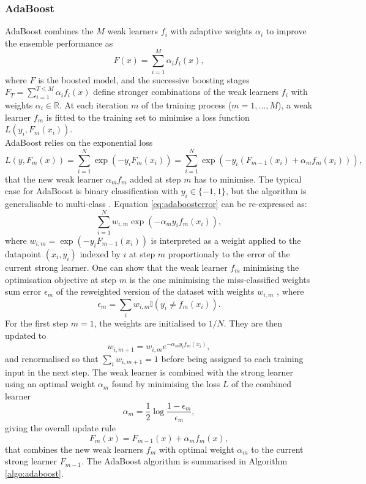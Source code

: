 \subsubsection{AdaBoost}\label{sub-adaboosted}
AdaBoost combines the $M$ weak learners $f_i$ with adaptive weights $\alpha_i$ to improve the ensemble performance as \[F(x) = \sum_{i=1}^M \alpha_i f_i(x),\] where $F$ is the boosted model, and the successive boosting stages $F_T = \sum_{i=1}^{T \leq M} \alpha_i f_i(x)$ define stronger combinations of the weak learners $f_i$ with weights $\alpha_i \in \mathbb{R}$. At each iteration $m$ of the training process ($m = 1, ..., M$), a weak learner $f_m$ is fitted to the training set to minimise a loss function $L(y_i, F_{m}(x_i))$. \\

AdaBoost relies on the exponential loss
\begin{equation}\label{eq:adaboosterror}
    L(y, F_m(x)) = \sum_{i=1}^N \exp\left(-y_i F_m(x_i)\right) = \sum_{i=1}^N \exp\left(-y_i (F_{m-1}(x_i) + \alpha_m f_m(x_i))\right),
\end{equation}
that the new weak learner $\alpha_m f_m$ added at step $m$ has to minimise. The typical case for AdaBoost is binary classification with $y_i \in \{-1, 1\}$, but the algorithm is generalisable to multi-class \cite{MurphyML}. Equation \ref{eq:adaboosterror} can be re-expressed as: \[\sum_{i=1}^N w_{i,m} \exp\left(-\alpha_m y_i f_m(x_i)\right),\] where $w_{i,m} = \exp\left(-y_i F_{m-1}(x_i)\right)$ is interpreted as a weight applied to the datapoint $(x_i, y_i)$  indexed by $i$ at step $m$ proportionaly to the error of the current strong learner. One can show that the weak learner $f_m$ minimising the optimisation objective at step $m$ is the one minimising the miss-classified weights sum error $\epsilon_m$ of the reweighted version of the dataset with weights $w_{i,m}$ \cite{MurphyML}, where \[\epsilon_m = \sum_i w_{i,m} \mathbb{I}(y_i \neq f_m(x_i)).\] For the first step $m = 1$, the weights are initialised to $1 / N$. They are then updated to \[w_{i,m+1} = w_{i,m} e^{-\alpha_m y_i f_m(x_i)},\] and renormalised so that $\sum_i w_{i, m+1} = 1$ before being assigned to each training input in the next step. The weak learner is combined with the strong learner using an optimal weight $\alpha_m$ found by minimising the loss $L$ of the combined learner \[\alpha_m = \frac{1}{2} \log \frac{1 - \epsilon_m}{\epsilon_m},\] giving the overall update rule
\begin{equation}\label{eq:updateOverall}
    F_m(x) = F_{m-1}(x) + \alpha_m f_m(x),
\end{equation}
that combines the new weak learners $f_m$ with optimal weight $\alpha_m$ to the current strong learner $F_{m-1}$. The AdaBoost algorithm is summarised in Algorithm \ref{algo:adaboost}.

